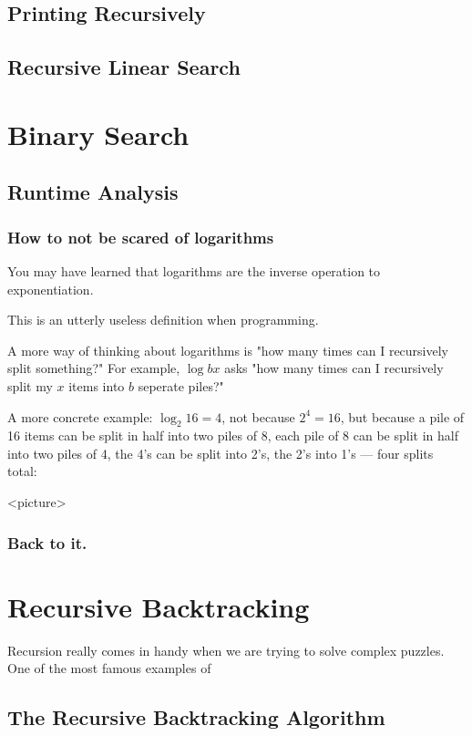 \documentclass[10pt,a4paper]{book}
\begin{document}
\subsection{Printing Recursively}
\subsection{Recursive Linear Search}


\section{Binary Search}



\subsection{Runtime Analysis}




\subsubsection{How to not be scared of logarithms }
You may have learned that logarithms are the inverse operation to exponentiation.


This is an utterly useless definition when programming.


A more way of thinking about logarithms is "how many times can I recursively split something?"
For example, $\log b x$ asks "how many times can I recursively split my $x$ items into $b$ seperate piles?"

A more concrete example: $\log_2 16 = 4$, not because $2^4 = 16$, but because a pile of 16 items can be split in half into two piles of 8, each pile of 8 can be split in half into two piles of 4, the 4's can be split into 2's, the 2's into 1's --- four splits total:

<picture>

\subsubsection{Back to it.}

\section{Recursive Backtracking}
Recursion really comes in handy when we are trying to solve complex puzzles.
One of the most famous examples of 

\subsection*{The Recursive Backtracking Algorithm}
\end{document}
